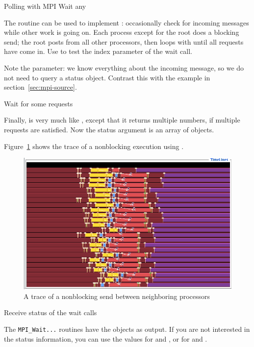  {Polling with MPI Wait any}

The  routine can be used to implement
: occasionally check for incoming messages while
other work is going on.
%
%
%
Each process except for the root does a blocking send; the root
posts  from all other processors, then loops
with  until all requests have come in. Use
 to test the index parameter of the wait
call.

Note the  parameter: we know everything
about the incoming message, so we do not need to query a status object.
Contrast this with the example in section~\ref{sec:mpi-source}.

 {Wait for some requests}

Finally,  is very much like ,
except that it returns multiple numbers, if multiple requests are
satisfied. Now the status argument is an array of 
objects.

Figure~\ref{fig:jump-nonblock} shows the trace of a nonblocking execution
using .
\begin{figure}[ht]
\includegraphics[scale=.4]{graphics/linear-nonblock}
\caption{A trace of a nonblocking send between neighboring processors}
\label{fig:jump-nonblock}
\end{figure}

 {Receive status of the wait calls}

The \lstinline{MPI_Wait...} routines have the 
objects as output.
If you are not interested in
the status information, you can use the values
 for  and
,
or  for 
and .

